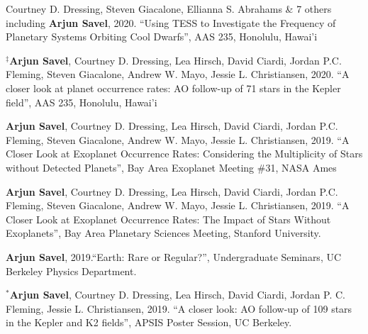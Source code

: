 \documentclass[12pt,letterpaper]{article}
\begin{document}
\ifdefined\withpubs
    

    \begin{list}{}{\cvlist}
    
    \end{list}

    \begin{list}{}{\cvlist}
    
    \end{list}
\fi

\begin{list}{}{\cvlist}

\item[{\color{numcolor}\scriptsize8}] Courtney D. Dressing, Steven Giacalone, Ellianna S. Abrahams \& 7 others including \textbf{Arjun Savel}, 2020. ``Using TESS to Investigate the Frequency of Planetary Systems Orbiting Cool Dwarfs'', AAS 235, Honolulu, Hawai'i

\item[{\color{numcolor}\scriptsize7}] $^\ddagger$\textbf{Arjun Savel}, Courtney D. Dressing, Lea Hirsch, David Ciardi, Jordan P.C. Fleming, Steven Giacalone, Andrew W. Mayo, Jessie L. Christiansen, 2020. “A closer look at planet occurrence rates: AO follow-up of 71 stars in the Kepler field”, AAS 235, Honolulu, Hawai'i

\item[{\color{numcolor}\scriptsize6}] \textbf{Arjun Savel}, Courtney D. Dressing, Lea Hirsch, David Ciardi, Jordan P.C. Fleming, Steven Giacalone, Andrew W. Mayo, Jessie L. Christiansen, 2019. “A Closer Look at Exoplanet Occurrence Rates: Considering the Multiplicity of Stars without Detected Planets”, Bay Area Exoplanet Meeting \#31, NASA Ames

\item[{\color{numcolor}\scriptsize5}] \textbf{Arjun Savel}, Courtney D. Dressing, Lea Hirsch, David Ciardi, Jordan P.C. Fleming, Steven Giacalone, Andrew W. Mayo, Jessie L. Christiansen, 2019. “A Closer Look at Exoplanet Occurrence Rates: The Impact of Stars Without Exoplanets”, Bay Area Planetary Sciences Meeting, Stanford University.

\item[{\color{numcolor}\scriptsize4}] \textbf{Arjun Savel}, 2019.“Earth: Rare or Regular?”, Undergraduate Seminars, UC Berkeley Physics Department.

\item[{\color{numcolor}\scriptsize3}] $^*$\textbf{Arjun Savel}, Courtney D. Dressing, Lea Hirsch, David Ciardi, Jordan P. C. Fleming, Jessie L. Christiansen, 2019. “A closer look: AO follow-up of 109 stars in the Kepler and K2 fields”, APSIS Poster Session, UC Berkeley.


\end{list}
\end{document}
